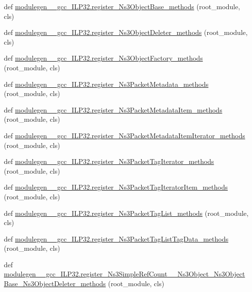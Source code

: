 \begin{DoxyCompactItemize}
\item 
def \hyperlink{namespacemodulegen____gcc__ILP32_ae2b1090e9e01cb32c1979aebbbf2d3d0}{modulegen\+\_\+\+\_\+gcc\+\_\+\+I\+L\+P32.\+register\+\_\+\+Ns3\+Object\+Base\+\_\+methods} (root\+\_\+module, cls)
\item 
def \hyperlink{namespacemodulegen____gcc__ILP32_ae7b70d95135f82e9f3f5abb42654e3de}{modulegen\+\_\+\+\_\+gcc\+\_\+\+I\+L\+P32.\+register\+\_\+\+Ns3\+Object\+Deleter\+\_\+methods} (root\+\_\+module, cls)
\item 
def \hyperlink{namespacemodulegen____gcc__ILP32_a3c95ec67fc1514c6b5c58314ef81e38e}{modulegen\+\_\+\+\_\+gcc\+\_\+\+I\+L\+P32.\+register\+\_\+\+Ns3\+Object\+Factory\+\_\+methods} (root\+\_\+module, cls)
\item 
def \hyperlink{namespacemodulegen____gcc__ILP32_a219b8e3d7145a4b09888203032e16df7}{modulegen\+\_\+\+\_\+gcc\+\_\+\+I\+L\+P32.\+register\+\_\+\+Ns3\+Packet\+Metadata\+\_\+methods} (root\+\_\+module, cls)
\item 
def \hyperlink{namespacemodulegen____gcc__ILP32_aa4a4a003c4a8b7886a31cb3d1b2f9062}{modulegen\+\_\+\+\_\+gcc\+\_\+\+I\+L\+P32.\+register\+\_\+\+Ns3\+Packet\+Metadata\+Item\+\_\+methods} (root\+\_\+module, cls)
\item 
def \hyperlink{namespacemodulegen____gcc__ILP32_af0c41f86c2c7e2875da9fd12e03ec3df}{modulegen\+\_\+\+\_\+gcc\+\_\+\+I\+L\+P32.\+register\+\_\+\+Ns3\+Packet\+Metadata\+Item\+Iterator\+\_\+methods} (root\+\_\+module, cls)
\item 
def \hyperlink{namespacemodulegen____gcc__ILP32_a9af269241fe2e52d9713c6fef73ade54}{modulegen\+\_\+\+\_\+gcc\+\_\+\+I\+L\+P32.\+register\+\_\+\+Ns3\+Packet\+Tag\+Iterator\+\_\+methods} (root\+\_\+module, cls)
\item 
def \hyperlink{namespacemodulegen____gcc__ILP32_a81cdb0716a2447fa9ebf30a8a43132d5}{modulegen\+\_\+\+\_\+gcc\+\_\+\+I\+L\+P32.\+register\+\_\+\+Ns3\+Packet\+Tag\+Iterator\+Item\+\_\+methods} (root\+\_\+module, cls)
\item 
def \hyperlink{namespacemodulegen____gcc__ILP32_a7f10f5444037901328380d4d5c08291a}{modulegen\+\_\+\+\_\+gcc\+\_\+\+I\+L\+P32.\+register\+\_\+\+Ns3\+Packet\+Tag\+List\+\_\+methods} (root\+\_\+module, cls)
\item 
def \hyperlink{namespacemodulegen____gcc__ILP32_aa623e91ff45aa8dce22ab35f70e26187}{modulegen\+\_\+\+\_\+gcc\+\_\+\+I\+L\+P32.\+register\+\_\+\+Ns3\+Packet\+Tag\+List\+Tag\+Data\+\_\+methods} (root\+\_\+module, cls)
\item 
def \hyperlink{namespacemodulegen____gcc__ILP32_ac5f5e4798fdbd14c15d133fdd259a2e0}{modulegen\+\_\+\+\_\+gcc\+\_\+\+I\+L\+P32.\+register\+\_\+\+Ns3\+Simple\+Ref\+Count\+\_\+\+\_\+\+Ns3\+Object\+\_\+\+Ns3\+Object\+Base\+\_\+\+Ns3\+Object\+Deleter\+\_\+methods} (root\+\_\+module, cls)

\end{DoxyCompactItemize}
